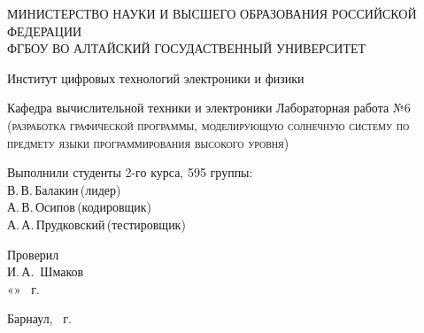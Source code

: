 \documentclass[a4paper,14pt]{extarticle}
\begin{document}
\begin{titlepage}
  \begin{center}
    \MakeUppercase{Министерство науки и высшего образования Российской Федерации} \\
    \MakeUppercase{ФГБОУ ВО Алтайский госудаственный университет}
    \vspace{0.25cm}
    
    Институт цифровых технологий электроники и физики
    
    Кафедра вычислительной техники и электроники
    \vfill
    {\LARGE Лабораторная работа №6 }\\[5mm]
    \textsc{(разработка графической программы, моделирующую солнечную систему по предмету языки программирования высокого уровня)}
  \bigskip
\end{center}
\vfill
\newlength{\ML}
\hfill\begin{minipage}{0.4\textwidth}
  Выполнили студенты 2-го курса, 595 группы:\\
  \underline{\hspace{\ML}} В.\,В.\,Балакин\,(лидер)\\
  \underline{\hspace{\ML}} А.\,В.\,Осипов\,(кодировщик)\\
  \underline{\hspace{\ML}} А.\,А.\,Прудковский\,(тестировщик)\\
\end{minipage}
\bigskip

\hfill\begin{minipage}{0.4\textwidth}
  Проверил\\
  \underline{\hspace{\ML}} И.\,А.~Шмаков\\
  «\underline{\hspace{0.7cm}}» \underline{\hspace{2cm}} \the\year~г.
\end{minipage}%
\vfill

\begin{center}
  Барнаул, \the\year~г.
\end{center}
\end{titlepage}

   \tableofcontents
   \newpage
\end{document}
